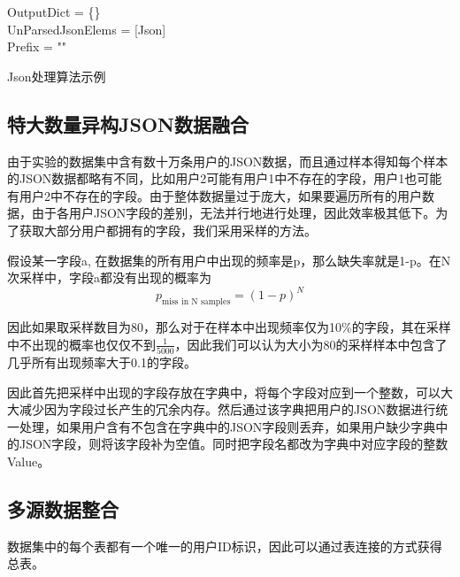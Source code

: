 \begin{algorithm}[htbp]
	\SetAlgoLined
	OutputDict = \{\}\\
	UnParsedJsonElems = [Json]\\
	Prefix = ""\\
	\caption{Json处理算法示例}
	\label{algo:algorithm1}
\end{algorithm}
\subsection{特大数量异构JSON数据融合}
由于实验的数据集中含有数十万条用户的JSON数据，而且通过样本得知每个样本的JSON数据都略有不同，比如用户2可能有用户1中不存在的字段，用户1也可能有用户2中不存在的字段。由于整体数据量过于庞大，如果要遍历所有的用户数据，由于各用户JSON字段的差别，无法并行地进行处理，因此效率极其低下。为了获取大部分用户都拥有的字段，我们采用采样的方法。

假设某一字段a, 在数据集的所有用户中出现的频率是p，那么缺失率就是1-p。在N次采样中，字段a都没有出现的概率为
\[ p_{\text{miss in N samples}} = (1-p)^N\]

因此如果取采样数目为80，那么对于在样本中出现频率仅为10\%的字段，其在采样中不出现的概率也仅仅不到$\frac{1}{5000}$，因此我们可以认为大小为80的采样样本中包含了几乎所有出现频率大于0.1的字段。

因此首先把采样中出现的字段存放在字典中，将每个字段对应到一个整数，可以大大减少因为字段过长产生的冗余内存。然后通过该字典把用户的JSON数据进行统一处理，如果用户含有不包含在字典中的JSON字段则丢弃，如果用户缺少字典中的JSON字段，则将该字段补为空值。同时把字段名都改为字典中对应字段的整数Value。

\subsection{多源数据整合}
数据集中的每个表都有一个唯一的用户ID标识，因此可以通过表连接的方式获得总表。

